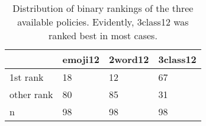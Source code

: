\begin{table}
	\caption{\label{tab:pws_pers:distribution-binary-ranks} Distribution of binary rankings of the three available policies. Evidently, 3class12 was ranked best in most cases. }
	\begin{tabular}{llll}
		~ 			& emoji12	& 2word12 	& 3class12 \\ \hline\hline
		1st rank	& 18		& 12		& 67 \\
		other rank 	& 80 		& 85 		& 31 \\ \hline
		n			& 98		& 98		& 98		 
	\end{tabular}
\end{table}
